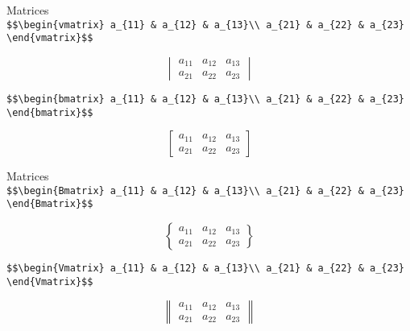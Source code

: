 \documentclass[
  ignorenonframetext,
]{beamer}
\begin{document}
\begin{frame}[fragile]{Matrices}
\protect\hypertarget{matrices-1}{}
\texttt{\$\$\textbackslash{}begin\{vmatrix\}\ a\_\{11\}\ \&\ a\_\{12\}\ \&\ a\_\{13\}\textbackslash{}\textbackslash{}\ a\_\{21\}\ \&\ a\_\{22\}\ \&\ a\_\{23\}\ \textbackslash{}end\{vmatrix\}\$\$}

\[\begin{vmatrix}
a_{11} & a_{12} & a_{13}\\
a_{21} & a_{22} & a_{23}
\end{vmatrix}\]

\texttt{\$\$\textbackslash{}begin\{bmatrix\}\ a\_\{11\}\ \&\ a\_\{12\}\ \&\ a\_\{13\}\textbackslash{}\textbackslash{}\ a\_\{21\}\ \&\ a\_\{22\}\ \&\ a\_\{23\}\ \textbackslash{}end\{bmatrix\}\$\$}

\[\begin{bmatrix}
a_{11} & a_{12} & a_{13}\\
a_{21} & a_{22} & a_{23}
\end{bmatrix}\]
\end{frame}

\begin{frame}[fragile]{Matrices}
\protect\hypertarget{matrices-2}{}
\texttt{\$\$\textbackslash{}begin\{Bmatrix\}\ a\_\{11\}\ \&\ a\_\{12\}\ \&\ a\_\{13\}\textbackslash{}\textbackslash{}\ a\_\{21\}\ \&\ a\_\{22\}\ \&\ a\_\{23\}\ \textbackslash{}end\{Bmatrix\}\$\$}

\[\begin{Bmatrix}
a_{11} & a_{12} & a_{13}\\
a_{21} & a_{22} & a_{23}
\end{Bmatrix}\]

\texttt{\$\$\textbackslash{}begin\{Vmatrix\}\ a\_\{11\}\ \&\ a\_\{12\}\ \&\ a\_\{13\}\textbackslash{}\textbackslash{}\ a\_\{21\}\ \&\ a\_\{22\}\ \&\ a\_\{23\}\ \textbackslash{}end\{Vmatrix\}\$\$}

\[\begin{Vmatrix}
a_{11} & a_{12} & a_{13}\\
a_{21} & a_{22} & a_{23}
\end{Vmatrix}\]
\end{frame}
\end{document}
